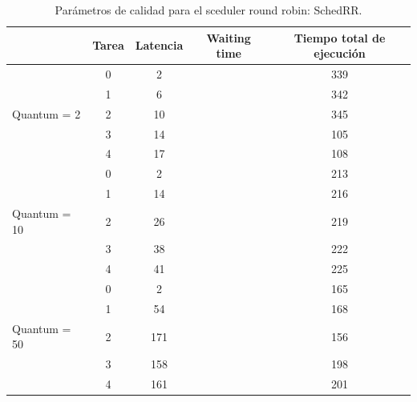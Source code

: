 \begin{table}[h!]
	\begin{center}
		\caption{Parámetros de calidad para el sceduler round robin: SchedRR.}
		\label{tab:table1}
		\begin{tabular}{|l|c|c|c|c|}
			\hline
			& Tarea & Latencia & Waiting time & Tiempo total de ejecución \\
			\hline
			\hline
			& 0 & 2 & & 339 \\ \cline{2-5}
			& 1 & 6 & & 342\\ \cline{2-5}
			Quantum = 2 & 2 & 10 & & 345 \\ \cline{2-5}
			& 3 & 14 & & 105 \\ \cline{2-5}
			& 4 & 17 & & 108 \\ 
			\hline
			\hline
			& 0 & 2 & & 213 \\ \cline{2-5}
			& 1 & 14 & & 216 \\ \cline{2-5}
			Quantum = 10 & 2 & 26 & & 219\\ \cline{2-5}
			& 3 & 38 & & 222 \\ \cline{2-5}
			& 4 & 41 & & 225 \\ 
			\hline
			\hline
			& 0 & 2 & & 165 \\ \cline{2-5}
			& 1 & 54 & & 168 \\ \cline{2-5}
			Quantum = 50 & 2 & 171 & & 156 \\ \cline{2-5}
			& 3 & 158 & & 198 \\ \cline{2-5}
			& 4 & 161 & & 201 \\
			\hline
		\end{tabular}
	\end{center}
\end{table}

\newpage